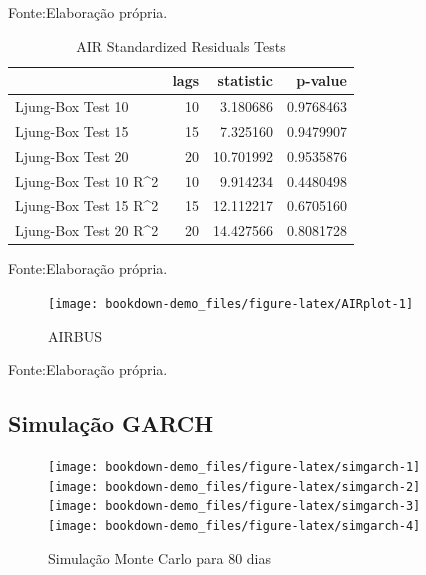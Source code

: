 \documentclass[
  12pt,
  a4paper,
  openany]{book}
\begin{document}
Fonte:Elaboração própria.

\justifying
\bigskip

\begin{table}[!h]

\caption{\label{tab:unnamed-chunk-32}AIR Standardized Residuals Tests}
\centering
\begin{tabular}[t]{lrrr}
\toprule
  & lags & statistic & p-value\\
\midrule
Ljung-Box Test 10 & 10 & 3.180686 & 0.9768463\\
Ljung-Box Test 15 & 15 & 7.325160 & 0.9479907\\
Ljung-Box Test 20 & 20 & 10.701992 & 0.9535876\\
Ljung-Box Test 10 R\textasciicircum{}2 & 10 & 9.914234 & 0.4480498\\
Ljung-Box Test 15 R\textasciicircum{}2 & 15 & 12.112217 & 0.6705160\\
\addlinespace
Ljung-Box Test 20 R\textasciicircum{}2 & 20 & 14.427566 & 0.8081728\\
\bottomrule
\end{tabular}
\end{table}
\FloatBarrier
\centering

Fonte:Elaboração própria.

\justifying
\bigskip
\begin{figure}

{\centering \texttt{[image: bookdown-demo\_files/figure-latex/AIRplot-1]} 

}

\caption{AIRBUS}\label{fig:AIRplot}
\end{figure}
\FloatBarrier
\centering

Fonte:Elaboração própria.

\justifying
\bigskip

\hypertarget{simulauxe7uxe3o-garch}{%
\subsection{Simulação GARCH}\label{simulauxe7uxe3o-garch}}

\scriptsize

\normalsize

\scriptsize

\normalsize

\begin{figure}

{\centering \texttt{[image: bookdown-demo\_files/figure-latex/simgarch-1]} \texttt{[image: bookdown-demo\_files/figure-latex/simgarch-2]} \texttt{[image: bookdown-demo\_files/figure-latex/simgarch-3]} \texttt{[image: bookdown-demo\_files/figure-latex/simgarch-4]} 

}

\caption{Simulação Monte Carlo para 80 dias}\label{fig:simgarch}
\end{figure}
\end{document}
